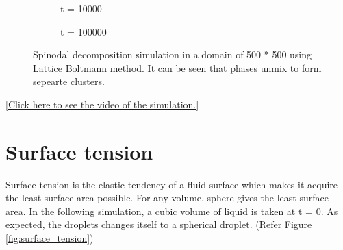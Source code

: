 \documentclass[a0,portrait]{a0poster}
\begin{document}
\begin{multicols}{3}
\begin{figure}[H]
\begin{subfigure}{4.2cm}
		\caption{t = 10000}
		\label{Fig:Data3}
	\end{subfigure}
	\begin{subfigure}{4.2cm}
		\centering
		\caption{t = 100000}
		\label{Fig:Data4}
	\end{subfigure}
	\caption{Spinodal decomposition simulation in a domain of 500 * 500 using Lattice Boltmann method. It can be seen that phases unmix to form sepearte clusters.}\label{fig:spinod}
\end{figure}
\begin{flushright}
	\href{https://www.youtube.com/watch?v=B9JiYVE437Y}{[Click here to see the video of the simulation.]}
\end{flushright}

\section{Surface tension}
Surface tension is the elastic tendency of a fluid surface which makes it acquire the least surface area possible. For any volume, sphere gives the least surface area. In the following simulation, a cubic volume of liquid is taken at t = 0. As expected, the droplets changes itself to a spherical droplet. (Refer Figure \ref{fig:surface_tension})


\end{multicols}
\end{document}
